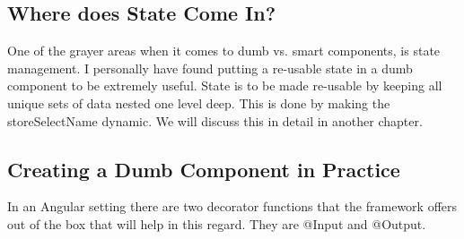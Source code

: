 \subsection{ Where does State Come In? }
One of the grayer areas when it comes to dumb vs. smart components, is state
management. I personally have found putting a re-usable state in a dumb
component to be extremely useful. State is to be made re-usable by keeping all
unique sets of data nested one level deep. This is done by making the
storeSelectName dynamic. We will discuss this in detail in another chapter.

\subsection{Creating a Dumb Component in Practice}
In an Angular setting there are two decorator functions that the framework
offers out of the box that will help in this regard. They are @Input and
@Output. 
